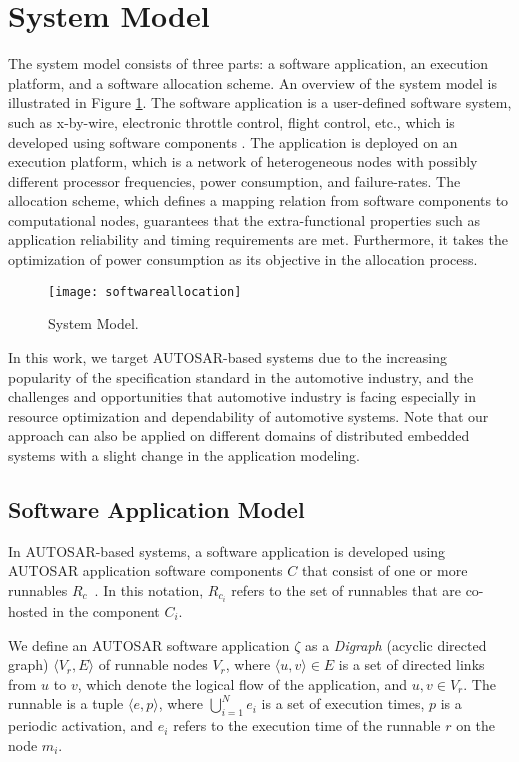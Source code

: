 \section{System Model}\label{sec_system}
The system model consists of three parts: a software application, an execution platform, and a software allocation scheme. An overview of the system model is illustrated in Figure \ref{fig_softwareallocation}. The software application is a user-defined software system, such as x-by-wire, electronic throttle control, flight control, etc., which is developed using software components \cite{softwarecomponents}\cite{Crnkovic2002BuildingSystems}. The application is deployed on an execution platform, which is a network of heterogeneous nodes with possibly different processor frequencies, power consumption, and failure-rates. The allocation scheme, which defines a mapping relation from software components to computational nodes, guarantees that the extra-functional properties such as application reliability and timing requirements are met. Furthermore, it takes the optimization of power consumption as its objective in the allocation process.
\begin{figure}[!h]
\centering
\texttt{[image: softwareallocation]}
\caption{System Model.}
\label{fig_softwareallocation}
\end{figure}

In this work, we target AUTOSAR-based systems due to the increasing popularity of the specification standard in  the automotive industry, and the challenges and opportunities that automotive industry is facing especially in resource optimization and dependability of automotive systems. Note that our approach can also be applied on different domains of distributed embedded systems with a slight change in the application modeling.

\subsection{Software Application Model}
In AUTOSAR-based systems, a software application is developed using AUTOSAR application software components $C$ that consist of one or more runnables $R_c$~\cite{Schreiner2007ABus}. In this notation, $R_{c_i}$ refers to the set of runnables that are co-hosted in the component $C_i$.
\begin{definition} We define an AUTOSAR software application $\zeta$ as a \textit{Digraph} (acyclic directed graph) $\langle V_r, E\rangle$ of runnable nodes $V_r$, where $\langle u,v\rangle\in E$ is a set of directed links from $u$ to $v$, which denote the logical flow of the application, and $u,v\in V_r$. The runnable is a tuple $\langle e, p \rangle$, where $\bigcup_{i=1}^{N} e_{i}$ is a set of execution times, $p$ is a periodic activation, and $e_i$ refers to the execution time of the runnable $r$ on the node $m_i$.
\end{definition}
 
